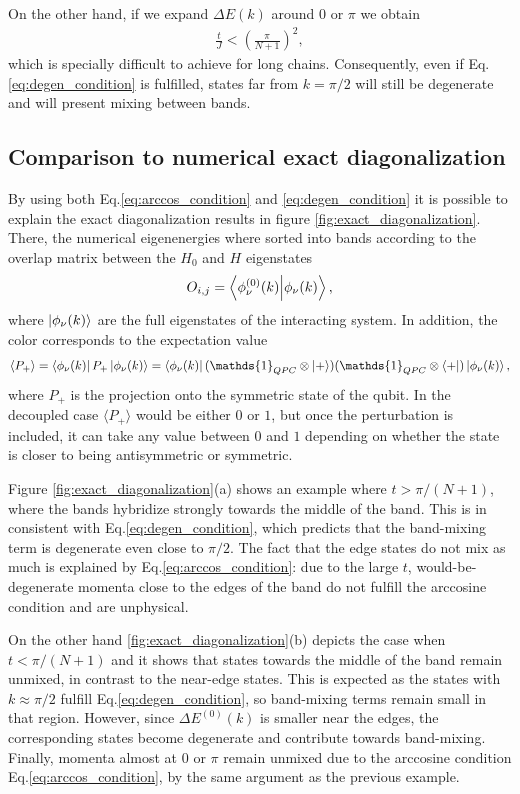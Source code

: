 \documentclass{article}
\newcommand{\Id}{\mathds{1}}
\begin{document}
On the other hand, if we expand $\Delta E(k)$ around $0$ or $\pi$ we obtain
\begin{align}
    \frac{t}{J}<\left(\frac{\pi}{N+1}\right)^2,
\end{align}
which is specially difficult to achieve for long chains.  Consequently, even if Eq.\eqref{eq:degen_condition} is fulfilled, states far from $k=\pi/2$ will still be degenerate and will present mixing between bands.

\subsection{Comparison to numerical exact diagonalization}

By using both Eq.\eqref{eq:arccos_condition} and \eqref{eq:degen_condition} it is possible to explain the exact diagonalization results in figure \ref{fig:exact_diagonalization}. There, the numerical eigenenergies where sorted into bands according to the overlap matrix between the $H_0$ and $H$ eigenstates
\begin{align}
    O_{i,j} = \bra{\phi_\nu^{(0)}(k)}\ket{\phi_\nu(k)},
\end{align}
where $\ket{\phi_\nu(k)}$ are the full eigenstates of the interacting system. In addition, the color corresponds to the expectation value
\begin{equation}
   \langle P_+\rangle= \bra{\phi_\nu (k)}P_{+}\ket{\phi_\nu (k)} = \bra{\phi_\nu (k)}(\Id_{QPC}\otimes\ket{+})(\Id_{QPC}\otimes\bra{+})\ket{\phi_\nu (k)},
\end{equation}
where $P_+$ is the projection onto the symmetric state of the qubit. In the decoupled case $\langle P_+\rangle$ would be either $0$ or $1$, but once the perturbation is included, it can take any value between $0$ and $1$ depending on whether the state is closer to being antisymmetric or symmetric.

Figure \ref{fig:exact_diagonalization}(a) shows an example where $t>\pi/(N+1)$, where the bands hybridize strongly towards the middle of the band. This is in consistent with Eq.\eqref{eq:degen_condition}, which predicts that the band-mixing term is degenerate even close to $\pi/2$. The fact that the edge states do not mix as much is explained by Eq.\eqref{eq:arccos_condition}: due to the large $t$, would-be-degenerate momenta close to the edges of the band do not fulfill the arccosine condition and are unphysical.

On the other hand \ref{fig:exact_diagonalization}(b) depicts the case when  $t<\pi/(N+1)$ and it shows that states towards the middle of the band remain unmixed, in contrast to the near-edge states. This is expected as the states with $k\approx \pi/2$ fulfill Eq.\eqref{eq:degen_condition}, so band-mixing terms remain small in that region. However, since $\Delta E^{(0)}(k)$ is smaller near the edges, the corresponding states become degenerate and contribute towards band-mixing. Finally, momenta almost at $0$ or $\pi$ remain unmixed due to the arccosine condition Eq.\eqref{eq:arccos_condition}, by the same argument as the previous example.
\end{document}
